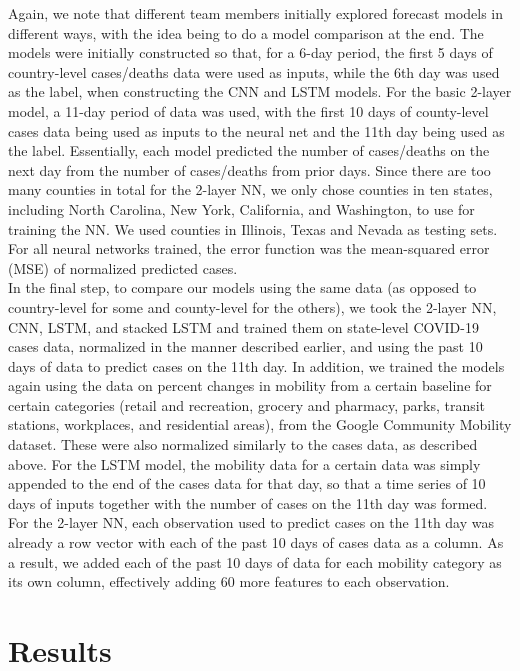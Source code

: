﻿\documentclass{article}
\begin{document}
\begin{multicols}{2}
Again, we note that different team members initially explored forecast models in
different ways, with the idea being to do a model comparison at the end. The
models were initially constructed so that, for a 6-day period, the first 5 days
of country-level cases/deaths data were used as inputs, while the 6th day was
used as the label, when constructing the CNN and LSTM models. For the basic
2-layer model, a 11-day period of data was used, with the first 10 days of
county-level cases data being used as inputs to the neural net and the 11th day
being used as the label. Essentially, each model predicted the number of
cases/deaths on the next day from the number of cases/deaths from prior days.
Since there are too many counties in total for the 2-layer NN, we only chose
counties in ten states, including North Carolina, New York, California, and
Washington, to use for training the NN. We used counties in Illinois, Texas and
Nevada as testing sets. For all neural networks trained, the error function was
the mean-squared error (MSE) of normalized predicted cases.\\
In the final step, to compare our models using the same data (as opposed to
country-level for some and county-level for the others), we took the 2-layer NN,
CNN, LSTM, and stacked LSTM and trained them on state-level COVID-19 cases data,
normalized in the manner described earlier, and using the past 10 days of data
to predict cases on the 11th day. In addition, we trained the models again using
the data on percent changes in mobility from a certain baseline for certain
categories (retail and recreation, grocery and pharmacy, parks, transit
stations, workplaces, and residential areas), from the Google Community Mobility
dataset. These were also normalized similarly to the cases data, as described
above. For the LSTM model, the mobility data for a certain data was simply
appended to the end of the cases data for that day, so that a time series of 10
days of inputs together with the number of cases on the 11th day was formed. For
the 2-layer NN, each observation used to predict cases on the 11th day was
already a row vector with each of the past 10 days of cases data as a column. As
a result, we added each of the past 10 days of data for each mobility category
as its own column, effectively adding 60 more features to each observation.

\section*{Results}


\end{multicols}
\end{document}
